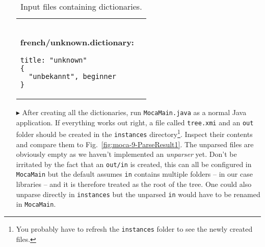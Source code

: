 \begin{enumerate}
\begin{table}
\begin{tabular}{p{6cm} p{6cm} }
\begin{verbatim}
\end{verbatim}
\textbf{french/unknown.dictionary:}
\begin{verbatim}
title: "unknown"
{
  "unbekannt", beginner
}
\end{verbatim}
  \\
\end{tabular}   
\caption{Input files containing dictionaries.}
\label{moca-inputdata}

\end{table}   

\item[$\blacktriangleright$] After creating all the dictionaries, run \texttt{MocaMain.java} as a normal Java application. 
If everything works out right, a file called \texttt{tree.xmi} and an \texttt{out} folder should be created in the \texttt{instances} directory\footnote{You probably have to refresh the \texttt{instances} folder to see the newly created files.}.  
Inspect their contents and compare them to Fig.~\ref{fig:moca-9-ParseResult1}. 
The unparsed files are obviously empty as we haven't implemented an \emph{unparser} yet.  
Don't be irritated by the fact that an \texttt{out/in} is created, this can all be configured in \texttt{MocaMain} but the default assumes \texttt{in} contains multiple folders -- in our case libraries -- and it is therefore treated as the root of the tree.  
One could also unparse directly in \texttt{instances} but the unparsed \texttt{in} would have to be renamed in \texttt{MocaMain}.
\end{enumerate}



